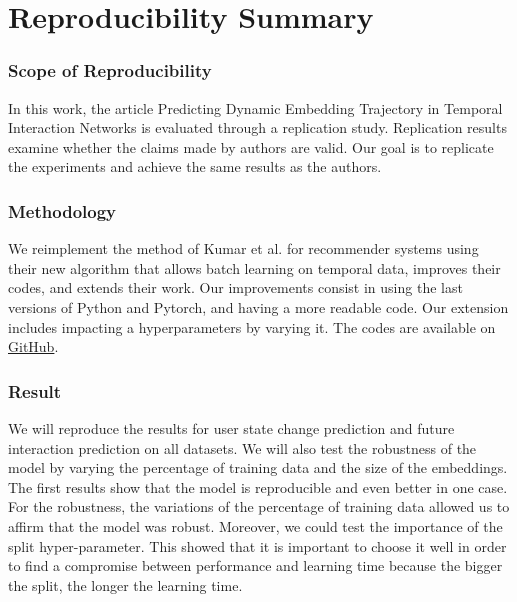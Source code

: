 

\newcommand{\amel}[1]{{\color{orange} #1}} 

\section*{Reproducibility Summary}


\subsubsection{Scope of Reproducibility}

In this work, the article Predicting Dynamic Embedding Trajectory in Temporal Interaction Networks \supercite{kumar2019predicting}  is evaluated through a replication study. Replication results examine whether the claims made by authors are valid. Our goal is to replicate the experiments and achieve the same results as the authors.

\subsubsection{Methodology}

We reimplement the method of Kumar et al.\supercite{kumar2019predicting} for recommender systems using their new algorithm that allows batch learning on temporal data, improves their codes, and extends their work. Our improvements consist in using the last versions of Python and  Pytorch, and having a more readable code. Our extension includes impacting a hyperparameters by varying it. The codes are available on \href{https://github.com/ComplexNetTSP/JODIE}{GitHub}. 

\subsubsection{Result}

We will reproduce the results for user state change prediction and future interaction prediction on all datasets. We will also test the robustness of the model by varying the percentage of training data and the size of the embeddings. The first results show that the model is reproducible and even better in one case. For the robustness, the variations of the percentage of training data allowed us to affirm that the model was robust. Moreover, we could test the importance of the split hyper-parameter. This showed that it is important to choose it well in order to find a compromise between performance and learning time because the bigger the split, the longer the learning time.


